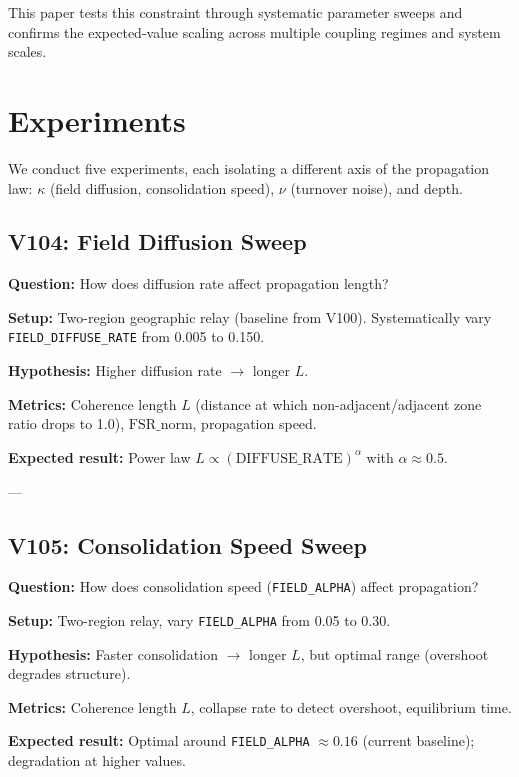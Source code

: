\documentclass[11pt]{article}
\begin{document}
This paper tests this constraint through systematic parameter sweeps and confirms the expected-value
scaling across multiple coupling regimes and system scales.

\section{Experiments}
\label{sec:experiments}

We conduct five experiments, each isolating a different axis of the propagation law:
$\kappa$ (field diffusion, consolidation speed), $\nu$ (turnover noise), and depth.

\subsection{V104: Field Diffusion Sweep}

\textbf{Question:} How does diffusion rate affect propagation length?

\textbf{Setup:} Two-region geographic relay (baseline from V100). Systematically vary \texttt{FIELD\_DIFFUSE\_RATE} from 0.005 to 0.150.

\textbf{Hypothesis:} Higher diffusion rate $\rightarrow$ longer $L$.

\textbf{Metrics:} Coherence length $L$ (distance at which non-adjacent/adjacent zone ratio drops to 1.0), $\text{FSR\_norm}$, propagation speed.

\textbf{Expected result:} Power law $L \propto (\text{DIFFUSE\_RATE})^{\alpha}$ with $\alpha \approx 0.5$.

---

\subsection{V105: Consolidation Speed Sweep}

\textbf{Question:} How does consolidation speed (\texttt{FIELD\_ALPHA}) affect propagation?

\textbf{Setup:} Two-region relay, vary \texttt{FIELD\_ALPHA} from 0.05 to 0.30.

\textbf{Hypothesis:} Faster consolidation $\rightarrow$ longer $L$, but optimal range (overshoot degrades structure).

\textbf{Metrics:} Coherence length $L$, collapse rate to detect overshoot, equilibrium time.

\textbf{Expected result:} Optimal around \texttt{FIELD\_ALPHA} $\approx 0.16$ (current baseline); degradation at higher values.
\end{document}
